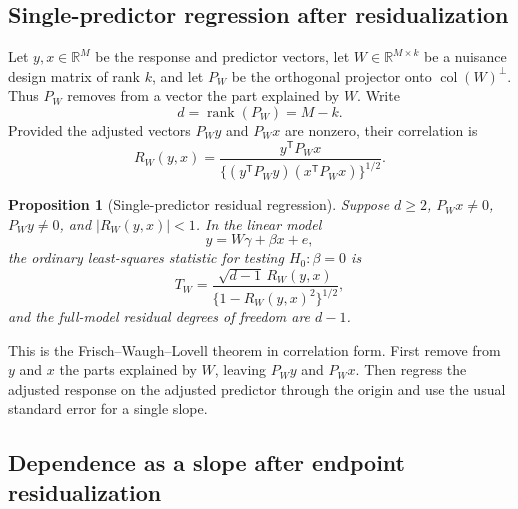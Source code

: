 \documentclass[11pt]{article}
\theoremstyle{plain}
\newtheorem{proposition}[theorem]{Proposition}
\theoremstyle{definition}
\theoremstyle{remark}
\newcommand{\R}{\mathbb R}
\newcommand{\rank}{\operatorname{rank}}
\begin{document}
\subsection{Single-predictor regression after residualization}

Let $y,x\in\R^M$ be the response and predictor vectors, let
$W\in\R^{M\times k}$ be a nuisance design matrix of rank $k$, and let $P_W$
be the orthogonal projector onto
$\operatorname{col}(W)^\perp$.  Thus $P_W$ removes from a vector the part
explained by $W$.  Write
\[
 d=\rank(P_W)=M-k.
\]
Provided the adjusted vectors $P_Wy$ and $P_Wx$ are nonzero, their correlation
is
\begin{equation}
 R_W(y,x)=
 \frac{y^\mathsf TP_Wx}
 {\{(y^\mathsf TP_Wy)(x^\mathsf TP_Wx)\}^{1/2}}.
 \label{eq:general-partial-edge-correlation}
\end{equation}

\begin{proposition}[Single-predictor residual regression]
\label{prop:general-edge-regression}
Suppose $d\ge2$, $P_Wx\ne0$, $P_Wy\ne0$, and $|R_W(y,x)|<1$.  In the linear model
\[
 y=W\gamma+\beta x+e,
\]
the ordinary least-squares statistic for testing $H_0:\beta=0$ is
\begin{equation}
 T_W=
 \frac{\sqrt{d-1}\,R_W(y,x)}
 {\{1-R_W(y,x)^2\}^{1/2}},
 \label{eq:general-edge-regression-t}
\end{equation}
and the full-model residual degrees of freedom are $d-1$.
\end{proposition}

This is the Frisch--Waugh--Lovell theorem in correlation form.  First remove
from $y$ and $x$ the parts explained by $W$, leaving $P_Wy$ and $P_Wx$.
Then regress the adjusted response on the adjusted predictor through the
origin and use the usual standard error for a single slope.

\subsection{Dependence as a slope after endpoint residualization}
\end{document}
